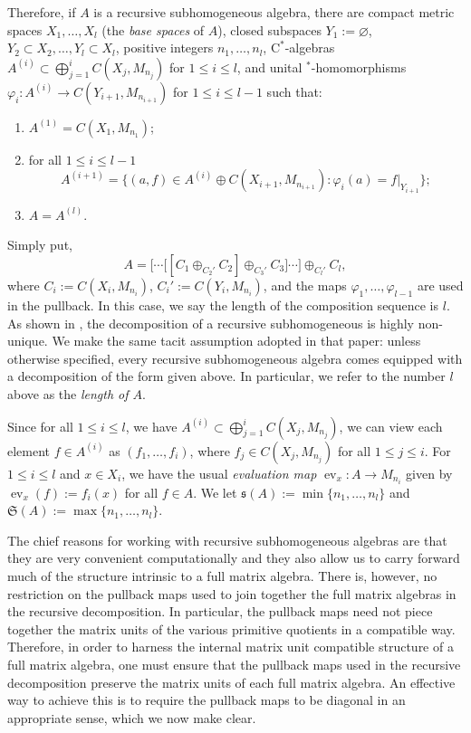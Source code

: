 \documentclass[12pt]{amsart}
\numberwithin{equation}{section}
\theoremstyle{definition}
\theoremstyle{remark}
\newcommand{\ev}{\operatorname{ev}}
\begin{document}
Therefore, if $A$ is a recursive subhomogeneous algebra, there are compact metric spaces $X_{1},\ldots, X_{ l}$ (the \textit{base spaces} of $A$), closed subspaces $Y_{1}:=\varnothing$, $Y_{2}\subset X_{2},\ldots, Y_{ l}\subset X_{ l}$, positive integers $n_{1},\ldots, n_{ l}$, $\mathrm{C}^*$-algebras  $A^{(i)}\subset\bigoplus_{j=1}^{i}C(X_{j},M_{n_{j}})$ for $1\leq i\leq  l$, and unital $^*$-homomorphisms $\varphi_{i}\colon A^{(i)}\to C(Y_{i+1},M_{n_{i+1}})$ for $1\leq i\leq  l-1$ such that:
\begin{enumerate}
	\item $A^{(1)}=C(X_{1},M_{n_{1}})$;
	\item for all $1\leq i\leq  l-1$
	$$
	A^{(i+1)}=\{(a,f)\in A^{(i)}\oplus C(X_{i+1},M_{n_{i+1}}):\varphi_{i}(a)=f|_{Y_{i+1}}\};
	$$
	\item $A=A^{( l)}$.
\end{enumerate}	
Simply put, 
$$
A=\bigg[\cdots\Big[\left[C_{1}\oplus_{C_{2}'}C_{2}\right]\oplus_{C_{3}'}C_{3}\Big]\cdots\bigg]\oplus_{C_{ l}'}C_{ l},
$$
where $C_{i}:=C(X_{i},M_{n_{i}})$, $C_{i}':=C(Y_{i},M_{n_{i}})$, and the maps $\varphi_{1},\ldots,\varphi_{ l-1}$ are used in the pullback. In this case, we say the length of the composition sequence is $ l$. As shown in \cite{phil}, the decomposition of a recursive subhomogeneous is highly non-unique. We make the same tacit assumption adopted in that paper: unless otherwise specified, every recursive subhomogeneous algebra comes equipped with a decomposition of the form given above. In particular, we refer to the number $ l$ above as the \textit{length of $A$}.

Since for all $1\leq i\leq l$, we have $A^{(i)}\subset\bigoplus_{j=1}^{i}C(X_{j},M_{n_{j}})$, we can view each element $f\in A^{(i)}$ as $(f_{1},\ldots,f_{i})$, where $f_{j}\in C(X_{j},M_{n_{j}})$ for all $1\leq j\leq i$. For $1\leq i\leq  l$ and $x\in X_{i}$, we have the usual \textit{evaluation map} $\ev_{x}\colon A\to M_{n_{i}}$ given by $\ev_{x}(f):=f_{i}(x)$ for all $f\in A$. We let $\mathfrak{s}(A):=\min\{n_{1},\ldots,n_{ l}\}$ and $\mathfrak{S}(A):=\max\{n_{1},\ldots,n_{ l}\}$.

The chief reasons for working with recursive subhomogeneous algebras are that they are very convenient computationally and they also allow us to carry forward much of the structure intrinsic to a full matrix algebra. There is, however, no restriction on the pullback maps used to join together the full matrix algebras in the recursive decomposition. In particular, the pullback maps need not piece together the matrix units of the various primitive quotients in a compatible way. Therefore, in order to harness the internal matrix unit compatible structure of a full matrix algebra, one must ensure that the pullback maps used in the recursive decomposition preserve the matrix units of each full matrix algebra. An effective way to achieve this is to require the pullback maps to be diagonal in an appropriate sense, which we now make clear. 
\end{document}
